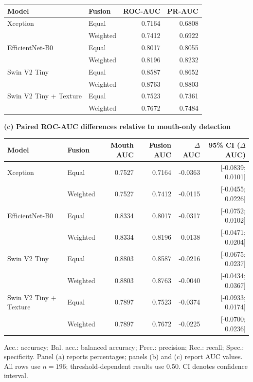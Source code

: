 \documentclass[a4paper]{elektr}
\begin{document}
\begin{table}[!htbp]
\begin{minipage}{15.8cm}
\begin{tabular*}{\linewidth}{@{\extracolsep{\fill}}llrr@{}}
Model & Fusion & ROC-AUC & PR-AUC \\\midrule
Xception & Equal & 0.7164 & 0.6808 \\
 & Weighted & 0.7412 & 0.6922 \\
EfficientNet-B0 & Equal & 0.8017 & 0.8055 \\
 & Weighted & 0.8196 & 0.8232 \\
Swin V2 Tiny & Equal & 0.8587 & 0.8652 \\
 & Weighted & 0.8763 & 0.8803 \\
Swin V2 Tiny + Texture & Equal & 0.7523 & 0.7361 \\
 & Weighted & 0.7672 & 0.7484 \\
\bottomrule\end{tabular*}
\par\medskip
\textbf{(c) Paired ROC-AUC differences relative to mouth-only detection}\par\smallskip
\begin{tabular*}{\linewidth}{@{\extracolsep{\fill}}llrrrr@{}}
\toprule
Model & Fusion & Mouth AUC & Fusion AUC & $\Delta$AUC & 95\% CI ($\Delta$AUC)\\\midrule
Xception & Equal & 0.7527 & 0.7164 & -0.0363 & [-0.0839; 0.0101] \\
 & Weighted & 0.7527 & 0.7412 & -0.0115 & [-0.0455; 0.0226] \\
EfficientNet-B0 & Equal & 0.8334 & 0.8017 & -0.0317 & [-0.0752; 0.0102] \\
 & Weighted & 0.8334 & 0.8196 & -0.0138 & [-0.0471; 0.0204] \\
Swin V2 Tiny & Equal & 0.8803 & 0.8587 & -0.0216 & [-0.0675; 0.0237] \\
 & Weighted & 0.8803 & 0.8763 & -0.0040 & [-0.0434; 0.0367] \\
Swin V2 Tiny + Texture & Equal & 0.7897 & 0.7523 & -0.0374 & [-0.0933; 0.0174] \\
 & Weighted & 0.7897 & 0.7672 & -0.0225 & [-0.0700; 0.0236] \\\bottomrule
\end{tabular*}
\par\smallskip\small
Acc.: accuracy; Bal. acc.: balanced accuracy; Prec.: precision; Rec.: recall; Spec.: specificity. Panel (a) reports percentages; panels (b) and (c) report AUC values. All rows use $n = 196$; threshold-dependent results use 0.50. CI denotes confidence interval.
\end{minipage}\end{table}
\end{document}
